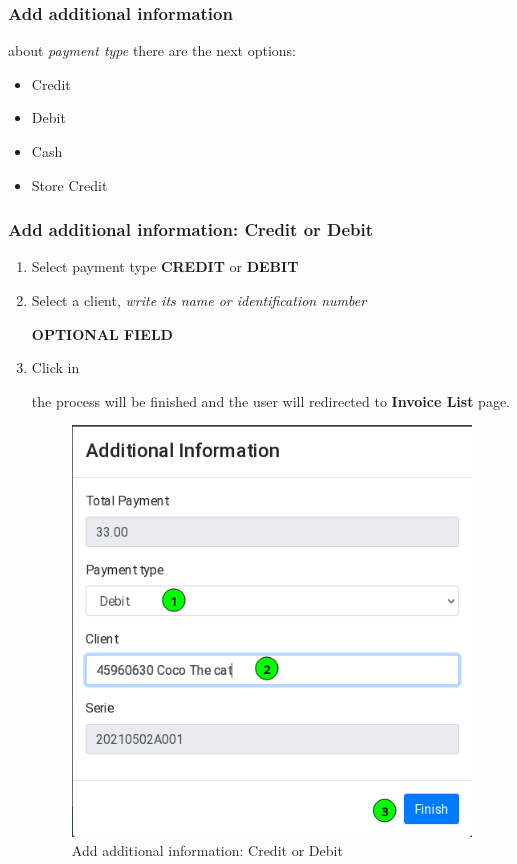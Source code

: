 \documentclass[a4paper,11pt]{refart}
\begin{document}
\subsubsection{Add additional information}
about \emph{payment type} there are the next options:
\begin{itemize}
	\item Credit
	\item Debit
	\item Cash
	\item Store Credit
\end{itemize}

\subsubsection{Add additional information: Credit or Debit}
\begin{enumerate}
	\item Select payment type \textbf{CREDIT} or \textbf{DEBIT}	
	\item Select a client, \emph{write its name or identification number}
	\medskip
	\begin{leftbar}
		\textbf{OPTIONAL FIELD}
	\end{leftbar}
	\item Click in  	
	\medskip
	\begin{leftbar}
		the process will be finished and the user will redirected to \textbf{Invoice List} page.
	\end{leftbar}
	\begin{figure}[H]\centering
		\includegraphics[width=\textwidth]{images/sellinvoice-5}
		\caption{Add additional information: Credit or Debit}\label{fig:sellinvoice-5}
	\end{figure}
\end{enumerate}
\end{document}
